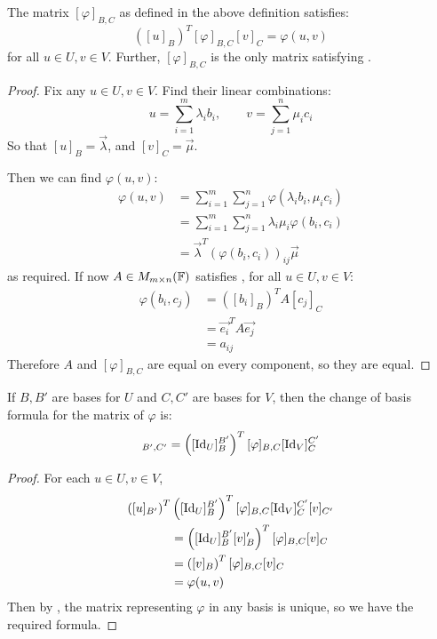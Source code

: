 \documentclass[../Main.tex]{subfiles}
\begin{document}
\begin{proposition}
    The matrix $[\varphi]_{B, C}$ as defined in the above definition satisfies:
    \begin{equation}
        \left([u]_B\right)^T [\varphi]_{B, C} [v]_C = \varphi(u, v)
        \label{eqnBFMatProduct}
    \end{equation}
    for all $u \in U, v \in V$. Further, $[\varphi]_{B, C}$ is the only matrix satisfying .
    \label{propBFMatProducts}
\end{proposition}
\begin{proof}
    Fix any $u \in U, v \in V$. Find their linear combinations:
    \begin{equation*}
        u = \sum_{i=1}^{m} \lambda_i b_i,\qquad v = \sum_{j=1}^{n} \mu_i c_i
    \end{equation*}
    So that $[u]_B = \vec{\lambda}$, and $[v]_C = \vec{\mu}$.

    Then we can find $\varphi(u, v)$:
    \begin{align*}
        \varphi(u, v) &= \sum_{i=1}^{m}\sum_{j=1}^{n} \varphi(\lambda_i b_i, \mu_i c_i) \\
        &= \sum_{i=1}^{m}\sum_{j=1}^{n} \lambda_i \mu_i\varphi(b_i, c_i) \\
        &= \vec{\lambda}^T \left(\varphi(b_i, c_i)\right)_{ij} \vec{\mu}
    \end{align*}
    as required. If now $A \in M_{m \times n}(\mathbb{F})$ satisfies , for all $u \in U, v \in V$:
    \begin{align*}
        \varphi(b_i, c_j)&= \left([b_i]_B\right)^T A [c_j]_C \\
        &= \vec{e_i}^T A \vec{e_j} \\
        &= a_{ij}
    \end{align*}
    Therefore $A$ and $[\varphi]_{B, C}$ are equal on every component, so they are equal.
\end{proof}
\begin{corollary}
    If $B, B'$ are bases for $U$ and $C, C'$ are bases for $V$, then the change of basis formula for the matrix of $\varphi$ is:
    \begin{equation*}
        [\varphi]_{B', C'} = \left([\Id_U]_B^{B'}\right)^T [\varphi]_{B, C} [\Id_V]_C^{C'}
    \end{equation*}
    \label{corBFChangeBasis}
\end{corollary}
\begin{proof}
    For each $u \in U, v \in V$,
    \begin{align*}
        \left([u]_{B'}\right)^T&\left([\operatorname{Id}_U]_B^{B'}\right)^T [\varphi]_{B, C} [\operatorname{Id}_V]_C^{C'}[v]_{C'} \\
        &= \left([\operatorname{Id}_U]_B^{B'} [v]_B'\right)^T [\varphi]_{B, C} [v]_C \\
        &= \left([v]_B\right)^T [\varphi]_{B, C} [v]_C \\
        &= \varphi(u, v)
    \end{align*}
    Then by , the matrix representing $\varphi$ in any basis is unique, so we have the required formula.
\end{proof}
\end{document}
